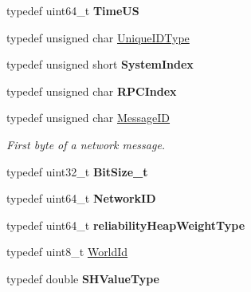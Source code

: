 \begin{DoxyCompactItemize}
\item 
\hypertarget{namespace_rak_net_a24344f46266e19fbe894f8ff7307cbff}{typedef uint64\-\_\-t {\bfseries Time\-U\-S}}\label{namespace_rak_net_a24344f46266e19fbe894f8ff7307cbff}

\item 
typedef unsigned char \hyperlink{namespace_rak_net_a707ca8f7aef0ea1fe295e1028af90c8c}{Unique\-I\-D\-Type}
\item 
\hypertarget{namespace_rak_net_a98fdd3ad5240fa553366e1fa5cb87dab}{typedef unsigned short {\bfseries System\-Index}}\label{namespace_rak_net_a98fdd3ad5240fa553366e1fa5cb87dab}

\item 
\hypertarget{namespace_rak_net_a6bbdec5502352e049b5f2f818a09d476}{typedef unsigned char {\bfseries R\-P\-C\-Index}}\label{namespace_rak_net_a6bbdec5502352e049b5f2f818a09d476}

\item 
\hypertarget{namespace_rak_net_a1b2f3bf4bad2bb6a8360a12295fbed0c}{typedef unsigned char \hyperlink{namespace_rak_net_a1b2f3bf4bad2bb6a8360a12295fbed0c}{Message\-I\-D}}\label{namespace_rak_net_a1b2f3bf4bad2bb6a8360a12295fbed0c}

\begin{DoxyCompactList}\small\item\em First byte of a network message. \end{DoxyCompactList}\item 
\hypertarget{namespace_rak_net_a99df97eaa89c9c5bd2aeefade616791d}{typedef uint32\-\_\-t {\bfseries Bit\-Size\-\_\-t}}\label{namespace_rak_net_a99df97eaa89c9c5bd2aeefade616791d}

\item 
\hypertarget{namespace_rak_net_aa01f9a52ab66ff73d60f1f6cad103a84}{typedef uint64\-\_\-t {\bfseries Network\-I\-D}}\label{namespace_rak_net_aa01f9a52ab66ff73d60f1f6cad103a84}

\item 
\hypertarget{namespace_rak_net_a989e42852b0085f80521e495db828f35}{typedef uint64\-\_\-t {\bfseries reliability\-Heap\-Weight\-Type}}\label{namespace_rak_net_a989e42852b0085f80521e495db828f35}

\item 
typedef uint8\-\_\-t \hyperlink{group___r_e_p_l_i_c_a___m_a_n_a_g_e_r___g_r_o_u_p3_ga44b59af8e882248f61aa41d8ace38bf7}{World\-Id}
\item 
\hypertarget{namespace_rak_net_a81654acf1b35609e026d004c58cca101}{typedef double {\bfseries S\-H\-Value\-Type}}\label{namespace_rak_net_a81654acf1b35609e026d004c58cca101}


\end{DoxyCompactItemize}
